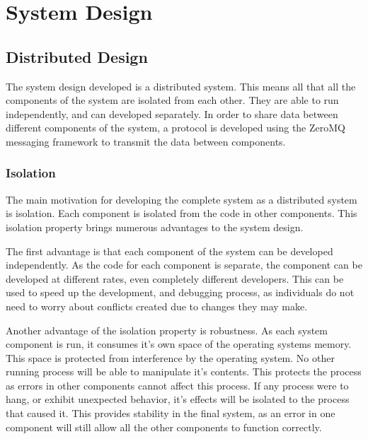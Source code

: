 
\chapter{System Design} %
\label{sec:design}


\ifpdf
    \graphicspath{{4/figures/PNG/}{4/figures/PDF/}{4/figures/}}
\else
    \graphicspath{{4/figures/EPS/}{4/figures/}}
\fi


\section{Distributed Design}
\label{sec:design}

The system design developed is a distributed system. This means all that all the components of the system are isolated from each other. They are able to run independently, and can developed separately. In order to share data between different components of the system, a protocol is developed using the ZeroMQ messaging framework to transmit the data between components.

\subsection{Isolation}

The main motivation for developing the complete system as a distributed system is isolation. Each component is isolated from the code in other components. This isolation property brings numerous advantages to the system design. 

The first advantage is that each component of the system can be developed independently. As the code for each component is separate, the component can be developed at different rates, even completely different developers. This can be used to speed up the development, and debugging process, as individuals do not need to worry about conflicts created due to changes they may make.

Another advantage of the isolation property is robustness. As each system component is run, it consumes it's own space of the operating systems memory. This space is protected from interference by the operating system. No other running process will be able to manipulate it's contents. This protects the process as errors in other components cannot affect this process. If any process were to hang, or exhibit unexpected behavior, it's effects will be isolated to the process that caused it. This provides stability in the final system, as an error in one component will still allow all the other components to function correctly.

